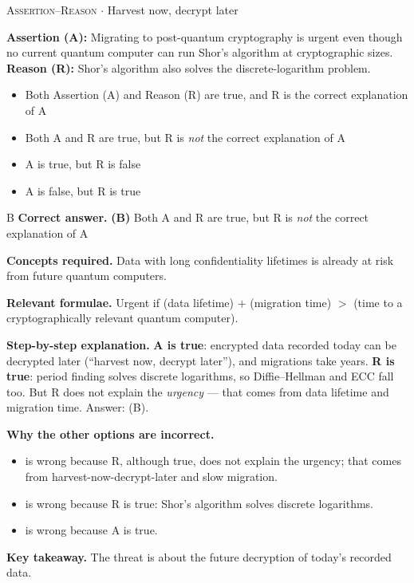 \documentclass[11pt,a4paper]{article}
\newcommand{\optlabel}[1]{\textbf{(#1)}}
\newcommand{\correctlabel}[1]{\textcolor{okgreen}{\textbf{(#1)}\,\ding{51}}}
\newenvironment{qitem}[1]{\begin{list}{}{\setlength{\leftmargin}{3.3em}\setlength{\labelwidth}{3.1em}%
  \setlength{\labelsep}{0.2em}\setlength{\topsep}{3pt}\setlength{\parsep}{3pt}}\item[\textbf{Q.#1}\hfill]}{\end{list}}
\newcommand{\qsep}{\par\vspace{2pt}{\color{black!15}\hrule}\vspace{4pt}}
\newcommand{\qmeta}[2]{{\footnotesize\color{black!60}\textsc{#1} \;$\cdot$\; #2}\par}
\begin{document}
\begin{qitem}{77}
\qmeta{Assertion--Reason}{Harvest now, decrypt later}
\textbf{Assertion (A):} Migrating to post-quantum cryptography is urgent even though no current quantum computer can run Shor's algorithm at
cryptographic sizes.\\[1mm]
\textbf{Reason (R):} Shor's algorithm also solves the discrete-logarithm problem.
\begin{itemize}[leftmargin=2.6em, labelsep=0.4em, itemsep=2pt, topsep=3pt]
\item[\optlabel{A}] Both Assertion (A) and Reason (R) are true, and R is the correct explanation of A
\item[\correctlabel{B}] Both A and R are true, but R is \emph{not} the correct explanation of A
\item[\optlabel{C}] A is true, but R is false
\item[\optlabel{D}] A is false, but R is true
\end{itemize}
\end{qitem}
\begin{solbox}{B}
\textbf{\color{brand}Correct answer.} \textcolor{okgreen}{\textbf{(B)}} Both A and R are true, but R is \emph{not} the correct explanation of A

\textbf{\color{brand}Concepts required.} Data with long confidentiality lifetimes is already at risk from future quantum computers.

\textbf{\color{brand}Relevant formulae.} Urgent if (data lifetime) $+$ (migration time) $>$ (time to a cryptographically relevant quantum computer).

\textbf{\color{brand}Step-by-step explanation.} \textbf{A is true}: encrypted data recorded today can be decrypted later (``harvest now, decrypt later''), and migrations take years. \textbf{R is true}: period
finding solves discrete logarithms, so Diffie--Hellman and ECC fall too. But R does not explain the \emph{urgency} --- that comes from data lifetime and
migration time. Answer: (B).

\textbf{\color{brand}Why the other options are incorrect.}
\begin{itemize}[leftmargin=2.4em, itemsep=1pt, topsep=2pt]
\item[\textbf{(A)}] is wrong because R, although true, does not explain the urgency; that comes from harvest-now-decrypt-later and slow migration.
\item[\textbf{(C)}] is wrong because R is true: Shor's algorithm solves discrete logarithms.
\item[\textbf{(D)}] is wrong because A is true.
\end{itemize}
\textbf{\color{brand}Key takeaway.} The threat is about the future decryption of today's recorded data.
\end{solbox}
\qsep
\end{document}
